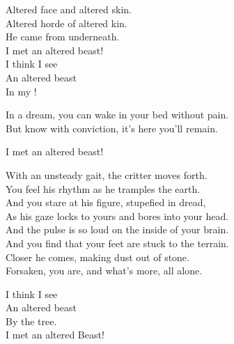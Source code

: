 Altered face and altered skin. \\
Altered horde of altered kin. \\

He came from underneath. \\
I met an altered beast! \\

I think I see \\
An altered beast \\
In my ! \\


In a dream, you can wake in your bed without pain. \\
But know with conviction, it's here you'll remain. \\


I met an altered beast! \\


With an unsteady gait, the critter moves forth. \\
You feel his rhythm as he tramples the earth. \\

And you stare at his figure, stupefied in dread, \\
As his gaze locks to yours and bores into your head. \\

And the pulse is so loud on the inside of your brain. \\
And you find that your feet are stuck to the terrain. \\

Closer he comes, making dust out of stone. \\
Forsaken, you are, and what's more, all alone. \\


I think I see \\
An altered beast \\
By the tree. \\

I met an altered Beast! \\




